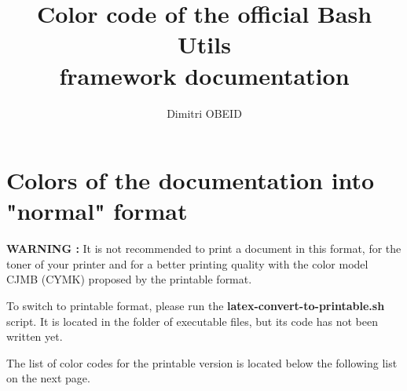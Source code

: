 \documentclass[a4paper,10pt]{article}
\title{\color{sec1}Color code of the official Bash Utils \\framework documentation}\color{text}
\author{Dimitri OBEID}
\begin{document}
\maketitle

\color{sec1}
\section{Colors of the documentation into "normal" format}\color{text}

\begin{justify}
  \textbf{\color{case}WARNING :} It is not recommended to print a document in this format, for the toner of your printer and for a better printing quality with the color model CJMB (CYMK) proposed by the printable format.

  To switch to printable format, please run the \textbf{\color{cmds}latex-convert-to-printable.sh} script. It is located in the folder of executable files, but its code has not been written yet.
\end{justify}

\begin{justify}
  The list of color codes for the printable version is located below the following list on the next page.
\end{justify}
\end{document}
